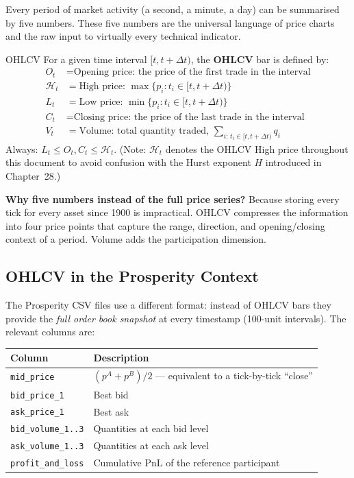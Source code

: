 \documentclass[12pt,a4paper,openany]{report}
\theoremstyle{definition}
\begin{document}
Every period of market activity (a second, a minute, a day) can be summarised by five numbers. These five numbers are the universal language of price charts and the raw input to virtually every technical indicator.

\begin{definitionbox}{OHLCV}
For a given time interval $[t, t + \Delta t)$, the \textbf{OHLCV} bar is defined by:
\begin{align*}
  O_t &= \text{Opening price: the price of the first trade in the interval} \\
  \mathcal{H}_t &= \text{High price: } \max\{p_i : t_i \in [t, t+\Delta t)\} \\
  L_t &= \text{Low price: } \min\{p_i : t_i \in [t, t+\Delta t)\} \\
  C_t &= \text{Closing price: the price of the last trade in the interval} \\
  V_t &= \text{Volume: total quantity traded, } \sum_{i:\, t_i \in [t,t+\Delta t)} q_i
\end{align*}
Always: $L_t \leq O_t, C_t \leq \mathcal{H}_t$. (Note: $\mathcal{H}_t$ denotes the OHLCV High price throughout this document to avoid confusion with the Hurst exponent $H$ introduced in Chapter~28.)
\end{definitionbox}

\textbf{Why five numbers instead of the full price series?}  Because storing every tick for every asset since 1900 is impractical. OHLCV compresses the information into four price points that capture the range, direction, and opening/closing context of a period. Volume adds the participation dimension.

\subsection{OHLCV in the Prosperity Context}

The Prosperity CSV files use a different format: instead of OHLCV bars they provide the \emph{full order book snapshot} at every timestamp (100-unit intervals). The relevant columns are:
\begin{center}
\begin{tabular}{ll}
\toprule
\textbf{Column} & \textbf{Description} \\
\midrule
\texttt{mid\_price} & $(p^A + p^B)/2$ — equivalent to a tick-by-tick ``close'' \\
\texttt{bid\_price\_1} & Best bid \\
\texttt{ask\_price\_1} & Best ask \\
\texttt{bid\_volume\_1..3} & Quantities at each bid level \\
\texttt{ask\_volume\_1..3} & Quantities at each ask level \\
\texttt{profit\_and\_loss} & Cumulative PnL of the reference participant \\
\bottomrule
\end{tabular}
\end{center}
\end{document}
